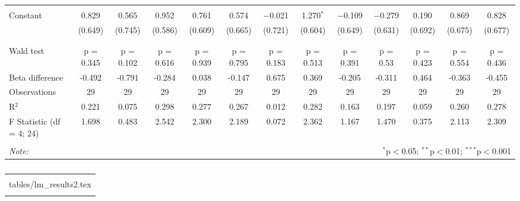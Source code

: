 \begin{table}[!htbp]
\begin{tabular}{@{\extracolsep{5pt}}lcccccccccccc}
  & & & & & & & & & & & & \\ 
 Constant & 0.829 & 0.565 & 0.952 & 0.761 & 0.574 & $-$0.021 & 1.270$^{*}$ & $-$0.109 & $-$0.279 & 0.190 & 0.869 & 0.828 \\ 
  & (0.649) & (0.745) & (0.586) & (0.609) & (0.665) & (0.721) & (0.604) & (0.649) & (0.631) & (0.692) & (0.675) & (0.677) \\ 
  & & & & & & & & & & & & \\ 
\hline \\[-1.8ex] 
Wald test & p = 0.345 & p = 0.102 & p = 0.616 & p = 0.939 & p = 0.795 & p = 0.183 & p = 0.513 & p = 0.391 & p = 0.53 & p = 0.423 & p = 0.554 & p = 0.436 \\ 
Beta difference & -0.492 & -0.791 & -0.284 & 0.038 & -0.147 & 0.675 & 0.369 & -0.205 & -0.311 & 0.464 & -0.363 & -0.455 \\ 
Observations & 29 & 29 & 29 & 29 & 29 & 29 & 29 & 29 & 29 & 29 & 29 & 29 \\ 
R$^{2}$ & 0.221 & 0.075 & 0.298 & 0.277 & 0.267 & 0.012 & 0.282 & 0.163 & 0.197 & 0.059 & 0.260 & 0.278 \\ 
F Statistic (df = 4; 24) & 1.698 & 0.483 & 2.542 & 2.300 & 2.189 & 0.072 & 2.362 & 1.167 & 1.470 & 0.375 & 2.113 & 2.309 \\ 
\hline 
\hline \\[-1.8ex] 
\textit{Note:}  & \multicolumn{12}{r}{$^{*}$p$<$0.05; $^{**}$p$<$0.01; $^{***}$p$<$0.001} \\ 
\end{tabular} 
\end{table} 

\begin{table}[!htbp] \centering 
  \caption{} 
  \label{} 
\begin{tabular}{@{\extracolsep{5pt}} c} 
\\[-1.8ex]\hline 
\hline \\[-1.8ex] 
tables/lm\_results2.tex \\ 
\hline \\[-1.8ex] 
\end{tabular} 
\end{table} 
